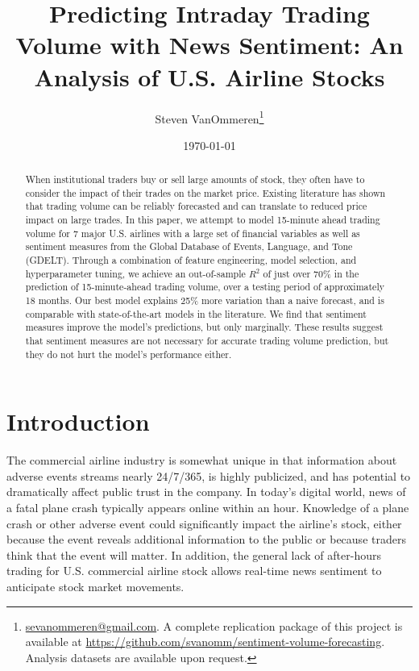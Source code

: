 \documentclass[12pt]{article}
\begin{document}
\title{Predicting Intraday Trading Volume with News Sentiment: An Analysis of U.S. Airline Stocks}
\author{Steven VanOmmeren\thanks{\href{mailto:sevanommeren@gmail.com}{sevanommeren@gmail.com}. A complete replication package of this project is available at \url{https://github.com/svanomm/sentiment-volume-forecasting}. Analysis datasets are available upon request.}}
\date{\today}
\maketitle
\begin{abstract}
\noindent
    When institutional traders buy or sell large amounts of stock, they often have to consider the impact of their trades on the market price. Existing literature has shown that trading volume can be reliably forecasted and can translate to reduced price impact on large trades. In this paper, we attempt to model 15-minute ahead trading volume for 7 major U.S. airlines with a large set of financial variables as well as sentiment measures from the Global Database of Events, Language, and Tone (GDELT). Through a combination of feature engineering, model selection, and hyperparameter tuning, we achieve an out-of-sample $R^2$ of just over 70\% in the prediction of 15-minute-ahead trading volume, over a testing period of approximately 18 months. Our best model explains 25\% more variation than a naive forecast, and is comparable with state-of-the-art models in the literature. We find that sentiment measures improve the model's predictions, but only marginally. These results suggest that sentiment measures are not necessary for accurate trading volume prediction, but they do not hurt the model's performance either. 
\end{abstract}
\newpage
\tableofcontents
\newpage

\doublespacing
\section{Introduction}
The commercial airline industry is somewhat unique in that information about adverse events streams nearly 24/7/365, is highly publicized, and has potential to dramatically affect public trust in the company. In today's digital world, news of a fatal plane crash typically appears online within an hour. Knowledge of a plane crash or other adverse event could significantly impact the airline's stock, either because the event reveals additional information to the public or because traders think that the event will matter. In addition, the general lack of after-hours trading for U.S. commercial airline stock allows real-time news sentiment to anticipate stock market movements.
\end{document}
